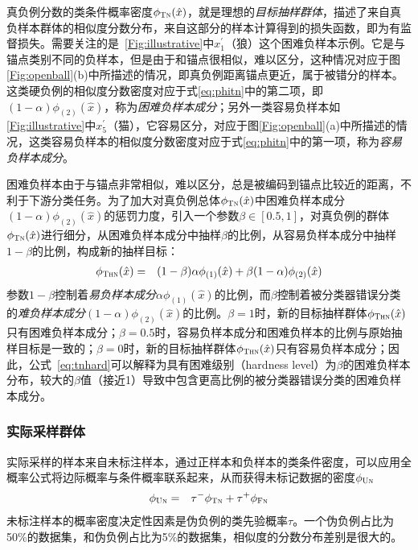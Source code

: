 真负例分数的类条件概率密度$\phi_{\textsc{Tn}}(\hat{x})$，就是理想的\textit{目标抽样群体}，描述了来自真负样本群体的相似度分数分布，来自这部分的样本计算得到的损失函数，即为有监督损失。需要关注的是~\ref{Fig:illustrative}中$x_1^\prime$（狼）这个困难负样本示例。它是与锚点类别不同的负样本，但是由于和锚点很相似，难以区分，这种情况对应于图\ref{Fig:openball}(b)中所描述的情况，即真负例距离锚点更近，属于被错分的样本。这类硬负例的相似度分数密度对应于式\eqref{eq:phitn}中的第二项，即$(1-\alpha)\phi_{(2)}(\hat{x})$，称为\textit{困难负样本成分}；另外一类容易负样本如\ref{Fig:illustrative}中$x_5^\prime$（猫），它容易区分，对应于图\ref{Fig:openball}(a)中所描述的情况，这类容易负样本的相似度分数密度对应于式\eqref{eq:phitn}中的第一项，称为\textit{容易负样本成分}。

困难负样本由于与锚点非常相似，难以区分，总是被编码到锚点比较近的距离，不利于下游分类任务。为了加大对真负例总体$\phi_{\textsc{Tn}}(\hat{x})$中困难负样本成分$(1-\alpha)\phi_{(2)}(\hat{x})$的惩罚力度，引入一个参数$\beta \in [0.5, 1]$，对真负例的群体$\phi_{\textsc{Tn}}(\hat{x}) $进行细分，从困难负样本成分中抽样$\beta$的比例，从容易负样本成分中抽样$1-\beta$的比例，构成新的抽样目标：
\begin{eqnarray}
	\phi_{\textsc{Thn}}(\hat{x}) 
	&=& (1-\beta)\alpha  \phi_{(1)}(\hat{x}) +\beta (1-\alpha)  \phi_{(2)}(\hat{x}) \label{eq:tnhard} 
\end{eqnarray}
参数$1-\beta$控制着\textit{易负样本成分}$\alpha \phi_{(1)}(\hat{x})$的比例，而$\beta$控制着被分类器错误分类的\textit{难负样本成分}$(1-\alpha)\phi_{(2)}(\hat{x})$的比例。$\beta= 1$时，新的目标抽样群体$\phi_{\textsc{Thn}}(\hat{x}) $只有困难负样本成分；$\beta = 0.5$时，容易负样本成分和困难负样本的比例与原始抽样目标是一致的；$\beta = 0$时，新的目标抽样群体$\phi_{\textsc{Thn}}(\hat{x}) $只有容易负样本成分；因此，公式~\eqref{eq:tnhard}可以解释为具有困难级别（hardness level）为$\beta$的困难负样本分布，较大的$\beta$值（接近1）导致中包含更高比例的被分类器错误分类的困难负样本成分。

\subsubsection{实际采样群体}
实际采样的样本来自未标注样本，通过正样本和负样本的类条件密度，可以应用全概率公式将边际概率与条件概率联系起来，从而获得未标记数据的密度$\phi_{\textsc{Un}}$
\begin{eqnarray}\label{eq:unlabel}
	\phi_{\textsc{Un}} &=& \tau^-\phi_{\textsc{Tn}} +\tau^+\phi_{\textsc{Fn}}  
\end{eqnarray} 
未标注样本的概率密度决定性因素是伪负例的类先验概率$\tau$。一个伪负例占比为50\%的数据集，和伪负例占比为5\%的数据集，相似度的分数分布差别是很大的。

